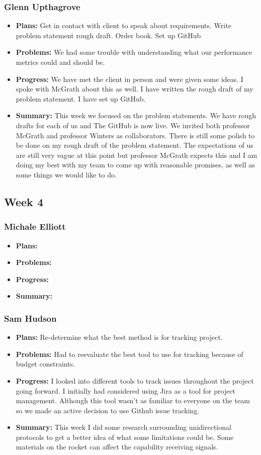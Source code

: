 \documentclass[onecolumn, draftclsnofoot,10pt, compsoc]{IEEEtran}
\begin{document}
\subsubsection{Glenn Upthagrove}
\begin {itemize}
 \item \textbf{Plans: }Get in contact with client to speak about requirements. Write problem statement rough draft. Order book. Set up GitHub
 \item \textbf{Problems: }We had some trouble with understanding what our performance metrics could and should be. 
 \item \textbf{Progress: }We have met the client in person and were given some ideas. I spoke with McGrath about this as well. I have written the rough draft of my problem statement. I have set up GitHub. 
 \item \textbf{Summary: }This week we focused on the problem statements. We have rough drafts for each of us and The GitHub is now live. We invited both professor McGrath and professor Winters as collaborators. There is still some polish to be done on my rough draft of the problem statement. The expectations of us are still very vague at this point but professor McGrath expects this and I am doing my best with my team to come up with reasonable promises, as well as some things we would like to do. 
\end {itemize}
\subsection {Week 4}
\subsubsection{Michale Elliott}
\begin {itemize}
 \item \textbf{Plans: }
 \item \textbf{Problems: }
 \item \textbf{Progress: }
 \item \textbf{Summary: }
\end {itemize}
\subsubsection{Sam Hudson}
\begin {itemize}
\item \textbf{Plans: }Re-determine what the best method is for tracking project.
\item \textbf{Problems: }Had to reevaluate the best tool to use for tracking because of budget constraints.
\item \textbf{Progress: }I looked into different tools to track issues throughout the project going forward. I initially had considered using Jira as a tool for project management. Although this tool wasn't as familiar to everyone on the team so we made an active decision to use Github issue tracking. 
\item \textbf{Summary: }This week I did some research surrounding unidirectional protocols to get a better idea of what some limitations could be. Some materials on the rocket can affect the capability receiving signals. 
\end {itemize}
\end{document}
